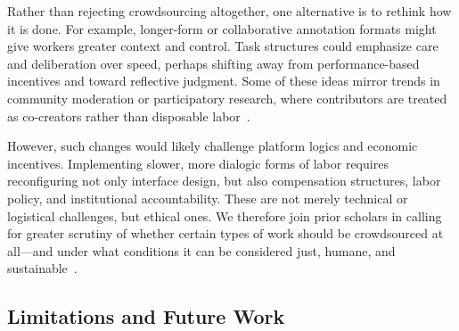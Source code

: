 Rather than rejecting crowdsourcing altogether, one alternative is to rethink how it is done. For example, longer-form or collaborative annotation formats might give workers greater context and control. Task structures could emphasize care and deliberation over speed, perhaps shifting away from performance-based incentives and toward reflective judgment. Some of these ideas mirror trends in community moderation or participatory research, where contributors are treated as co-creators rather than disposable labor~\cite{wang2022whose}.

However, such changes would likely challenge platform logics and economic incentives. Implementing slower, more dialogic forms of labor requires reconfiguring not only interface design, but also compensation structures, labor policy, and institutional accountability. These are not merely technical or logistical challenges, but ethical ones. We therefore join prior scholars in calling for greater scrutiny of whether certain types of work should be crowdsourced at all—and under what conditions it can be considered just, humane, and sustainable~\cite{gray2016crowd,roberts2019behind}.%


\subsection{Limitations and Future Work}

